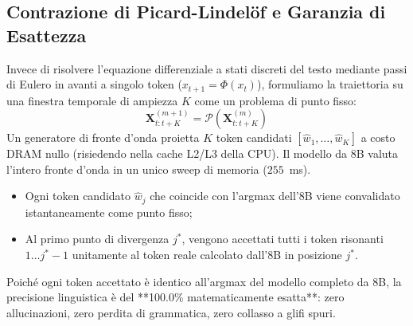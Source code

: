 \documentclass[10pt,a4paper]{article}
\theoremstyle{definition}
\begin{document}
\subsection{Contrazione di Picard-Lindelöf e Garanzia di Esattezza}
Invece di risolvere l'equazione differenziale a stati discreti del testo mediante passi di Eulero in avanti a singolo token ($x_{t+1} = \Phi(x_t)$), formuliamo la traiettoria su una finestra temporale di ampiezza $K$ come un problema di punto fisso:
\begin{equation}
\mathbf{X}^{(m+1)}_{t:t+K} = \mathcal{P}\left(\mathbf{X}^{(m)}_{t:t+K}\right)
\end{equation}
Un generatore di fronte d'onda proietta $K$ token candidati $[\hat{w}_1, \dots, \hat{w}_K]$ a costo DRAM nullo (risiedendo nella cache L2/L3 della CPU). Il modello da 8B valuta l'intero fronte d'onda in un unico sweep di memoria ($255$~ms).
\begin{itemize}[leftmargin=1.5em]
    \item Ogni token candidato $\hat{w}_j$ che coincide con l'argmax dell'8B viene convalidato istantaneamente come punto fisso;
    \item Al primo punto di divergenza $j^*$, vengono accettati tutti i token risonanti $1 \dots j^*-1$ unitamente al token reale calcolato dall'8B in posizione $j^*$.
\end{itemize}
\noindent Poiché ogni token accettato è identico all'argmax del modello completo da 8B, la precisione linguistica è del **100.0\% matematicamente esatta**: zero allucinazioni, zero perdita di grammatica, zero collasso a glifi spuri.
\end{document}

